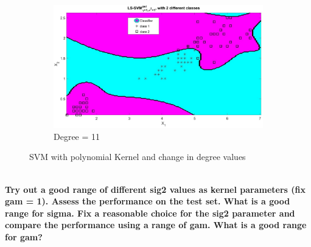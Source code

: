\documentclass[12pt]{report}
\begin{document}
{\begin{figure}[!htbp]
\begin{subfigure}{.33\textwidth}
 		\includegraphics[height=0.8\linewidth,width=1\linewidth]{Ex1.3_deg(11).jpg}
 		\caption{Degree = 11}
 		\label{fig:deg(11)}
 	\end{subfigure}%
 	\caption{SVM with polynomial Kernel and change in degree values}
 	\label{fig:deg}
 \end{figure}\\
 \textbf{Try out a good range of different sig2 values as kernel parameters (fix gam = 1). Assess the performance on the test set. What is a good range for sigma. Fix a reasonable choice for the sig2 parameter and compare the performance using a range of gam. What is a good range for gam?}

}
\end{document}
